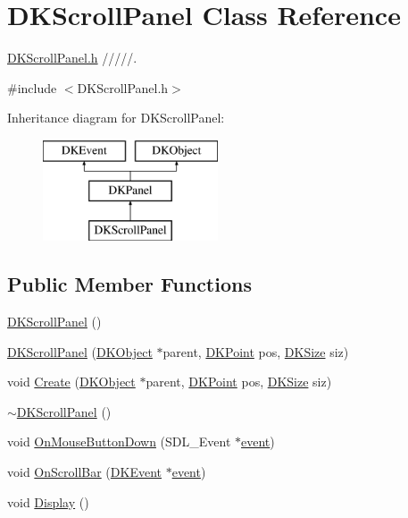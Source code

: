 \hypertarget{class_d_k_scroll_panel}{\section{D\-K\-Scroll\-Panel Class Reference}
\label{class_d_k_scroll_panel}
}


\hyperlink{_d_k_scroll_panel_8h}{D\-K\-Scroll\-Panel.\-h} /////.  




{\ttfamily \#include $<$D\-K\-Scroll\-Panel.\-h$>$}

Inheritance diagram for D\-K\-Scroll\-Panel\-:\begin{figure}[H]
\begin{center}
\leavevmode
\includegraphics[height=3.000000cm]{class_d_k_scroll_panel}
\end{center}
\end{figure}
\subsection*{Public Member Functions}
\begin{DoxyCompactItemize}
\item 
\hyperlink{class_d_k_scroll_panel_addecedd87951af2f3ecbcdd5b9f51e2d}{D\-K\-Scroll\-Panel} ()
\item 
\hyperlink{class_d_k_scroll_panel_a1b3c39f153d4f300acdeba1c44cd221a}{D\-K\-Scroll\-Panel} (\hyperlink{class_d_k_object}{D\-K\-Object} $\ast$parent, \hyperlink{_d_k_axis_8h_a0ca1f005fbb936f8e7a7f2433591f418}{D\-K\-Point} pos, \hyperlink{_d_k_axis_8h_aaa25a8c7cbf504fffdb8a4208ff7a731}{D\-K\-Size} siz)
\item 
void \hyperlink{class_d_k_scroll_panel_a8eadc852d49978489d26e49b8834535e}{Create} (\hyperlink{class_d_k_object}{D\-K\-Object} $\ast$parent, \hyperlink{_d_k_axis_8h_a0ca1f005fbb936f8e7a7f2433591f418}{D\-K\-Point} pos, \hyperlink{_d_k_axis_8h_aaa25a8c7cbf504fffdb8a4208ff7a731}{D\-K\-Size} siz)
\item 
\hyperlink{class_d_k_scroll_panel_a26d7610df1a5c9d1fc8031201e12613e}{$\sim$\-D\-K\-Scroll\-Panel} ()
\item 
void \hyperlink{class_d_k_scroll_panel_acfdcd926177b3549a9d00c61c6be266f}{On\-Mouse\-Button\-Down} (S\-D\-L\-\_\-\-Event $\ast$\hyperlink{class_d_k_event_a3deebb932ed734363c4ece87971bc45f}{event})
\item 
void \hyperlink{class_d_k_scroll_panel_a7f9de4ef8e11ca25f78d642c4362f7e4}{On\-Scroll\-Bar} (\hyperlink{class_d_k_event}{D\-K\-Event} $\ast$\hyperlink{class_d_k_event_a3deebb932ed734363c4ece87971bc45f}{event})
\item 
void \hyperlink{class_d_k_scroll_panel_a7bb4a417866ae44143a5610eccd63450}{Display} ()
\end{DoxyCompactItemize}
